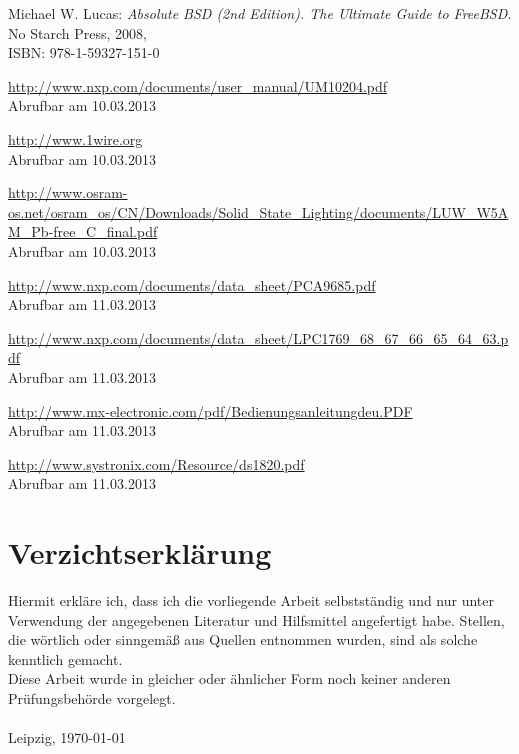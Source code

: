 \documentclass[a4paper,12pt]{scrartcl}
\begin{document}
\renewcommand\refname{Literaturverzeichnis}
\begin{thebibliography}{999}

Michael W. Lucas:  {\sl Absolute BSD (2nd Edition). The Ultimate Guide to FreeBSD.} No Starch Press, 2008,
\\ISBN: 978-1-59327-151-0

\end{thebibliography}

\renewcommand\refname{Quellenverzeichnis}
\begin{thebibliography}{999}

\url{http://www.nxp.com/documents/user_manual/UM10204.pdf}
\\Abrufbar am 10.03.2013

\url{http://www.1wire.org}
\\Abrufbar am 10.03.2013

\url{http://www.osram-os.net/osram_os/CN/Downloads/Solid_State_Lighting/documents/LUW_W5AM_Pb-free_C_final.pdf}
\\Abrufbar am 10.03.2013

\url{http://www.nxp.com/documents/data_sheet/PCA9685.pdf}
\\Abrufbar am 11.03.2013

\url{http://www.nxp.com/documents/data_sheet/LPC1769_68_67_66_65_64_63.pdf}
\\Abrufbar am 11.03.2013

\url{http://www.mx-electronic.com/pdf/Bedienungsanleitungdeu.PDF}
\\Abrufbar am 11.03.2013

\url{http://www.systronix.com/Resource/ds1820.pdf}
\\Abrufbar am 11.03.2013

\end{thebibliography}

\clearpage
\section{Verzichtserkl\"arung}
\thispagestyle{plain}

Hiermit erkläre ich, dass ich die vorliegende Arbeit selbstständig und nur unter Verwendung der angegebenen Literatur und Hilfsmittel angefertigt habe.
Stellen, die wörtlich oder sinngemäß aus Quellen entnommen wurden, sind als solche
kenntlich gemacht.\\

Diese Arbeit wurde in gleicher oder ähnlicher Form noch keiner anderen Prüfungsbehörde vorgelegt.\\\\

Leipzig, \today
\end{document}
